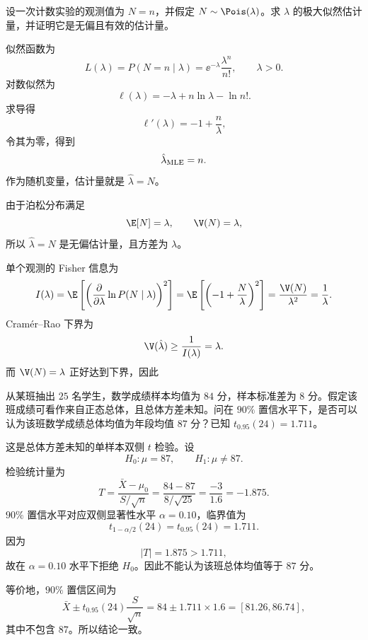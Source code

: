 \begin{question}[泊松均值的有效估计]
设一次计数实验的观测值为 $N=n$，并假定 $N\sim\Pois(\lambda)$。求 $\lambda$ 的极大似然估计量，并证明它是无偏且有效的估计量。
\begin{solution}
似然函数为
\[
L(\lambda)=P(N=n\mid \lambda)=\ee^{-\lambda}\frac{\lambda^n}{n!},
\qquad \lambda>0.
\]
对数似然为
\[
\ell(\lambda)=-\lambda+n\ln\lambda-\ln n!.
\]
求导得
\[
\ell'(\lambda)=-1+\frac{n}{\lambda},
\]
令其为零，得到
\[
\hat\lambda_{\rm MLE}=n.
\]
作为随机变量，估计量就是 $\hat\lambda=N$。

由于泊松分布满足
\[
\E[N]=\lambda,
\qquad
\V(N)=\lambda,
\]
所以 $\hat\lambda=N$ 是无偏估计量，且方差为 $\lambda$。

单个观测的 Fisher 信息为
\[
I(\lambda)=\E\left[\left(\frac{\partial}{\partial\lambda}\ln P(N\mid\lambda)\right)^2\right]
=\E\left[\left(-1+\frac{N}{\lambda}\right)^2\right]
=\frac{\V(N)}{\lambda^2}=\frac1\lambda.
\]
Cram\'er--Rao 下界为
\[
\V(\hat\lambda)\ge \frac1{I(\lambda)}=\lambda.
\]
而 $\V(N)=\lambda$ 正好达到下界，因此
\end{solution}
\end{question}

\begin{question}[单样本 $t$ 检验]
从某班抽出 $25$ 名学生，数学成绩样本均值为 $84$ 分，样本标准差为 $8$ 分。假定该班成绩可看作来自正态总体，且总体方差未知。问在 $90\%$ 置信水平下，是否可以认为该班数学成绩总体均值为年段均值 $87$ 分？已知 $t_{0.95}(24)=1.711$。
\begin{solution}
这是总体方差未知的单样本双侧 $t$ 检验。设
\[
H_0:\mu=87,
\qquad
H_1:\mu\ne87.
\]
检验统计量为
\[
T=\frac{\bar X-\mu_0}{S/\sqrt n}
=\frac{84-87}{8/\sqrt{25}}
=\frac{-3}{1.6}=-1.875.
\]
$90\%$ 置信水平对应双侧显著性水平 $\alpha=0.10$，临界值为
\[
t_{1-\alpha/2}(24)=t_{0.95}(24)=1.711.
\]
因为
\[
|T|=1.875>1.711,
\]
故在 $\alpha=0.10$ 水平下拒绝 $H_0$。因此不能认为该班总体均值等于 $87$ 分。

等价地，$90\%$ 置信区间为
\[
\bar X\pm t_{0.95}(24)\frac{S}{\sqrt n}
=84\pm1.711\times1.6
=[81.26,86.74],
\]
其中不包含 $87$。所以结论一致。
\end{solution}
\end{question}

